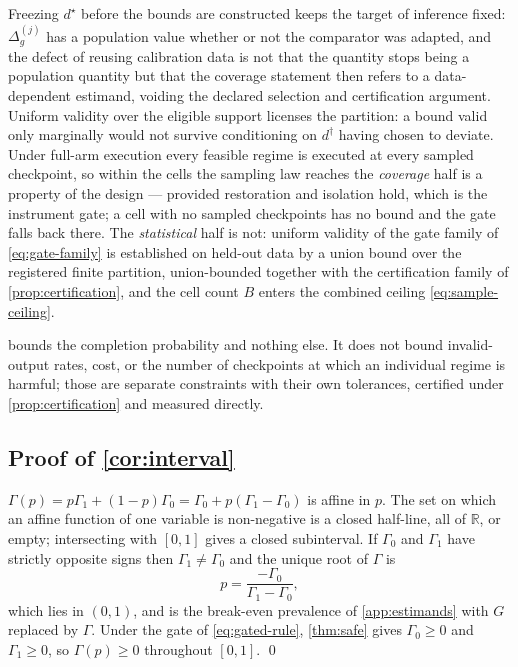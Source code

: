 \begin{remark}
Freezing $d^\star$ before the bounds are constructed keeps the target of
inference fixed: $\Delta^{(j)}_g$ has a population value whether or not the
comparator was adapted, and the defect of reusing calibration data is not that
the quantity stops being a population quantity but that the coverage statement
then refers to a data-dependent estimand, voiding the declared selection and
certification argument.  Uniform validity over the eligible support licenses the
partition: a bound valid only marginally would not survive conditioning on
$d^\dagger$ having chosen to deviate.  Under full-arm execution every feasible
regime is executed at every sampled checkpoint, so within the cells the
sampling law reaches the \emph{coverage} half is a property of the design ---
provided restoration and isolation hold, which is the instrument gate; a cell
with no sampled checkpoints has no bound and the gate falls back there.  The \emph{statistical} half is not: uniform validity of the gate family
of \cref{eq:gate-family} is established on held-out data by a union bound over
the registered finite partition, union-bounded together with the certification
family of \cref{prop:certification}, and the cell count $B$ enters the combined
ceiling \eqref{eq:sample-ceiling}.
\end{remark}
\begin{remark}
 bounds the completion probability and nothing else.  It does not
bound invalid-output rates, cost, or the number of checkpoints at which an
individual regime is harmful; those are separate constraints with their own
tolerances, certified under \cref{prop:certification} and measured directly.
\end{remark}

\subsection{Proof of \texorpdfstring{\cref{cor:interval}}{the guarantee-interval corollary}}

$\Gamma(p)=p\Gamma_1+(1-p)\Gamma_0=\Gamma_0+p(\Gamma_1-\Gamma_0)$ is affine in
$p$.  The set on which an affine function of one variable is non-negative is a
closed half-line, all of $\mathbb R$, or empty; intersecting with $[0,1]$ gives a
closed subinterval.  If $\Gamma_0$ and $\Gamma_1$ have strictly opposite signs
then $\Gamma_1\neq\Gamma_0$ and the unique root of $\Gamma$ is
\begin{equation}
 p=\frac{-\Gamma_0}{\Gamma_1-\Gamma_0},
\end{equation}
which lies in $(0,1)$, and is the break-even prevalence of
\cref{app:estimands} with $G$ replaced by $\Gamma$.  Under the gate of
\eqref{eq:gated-rule}, \cref{thm:safe} gives $\Gamma_0\ge0$ and $\Gamma_1\ge0$,
so $\Gamma(p)\ge0$ throughout $[0,1]$. \qed

